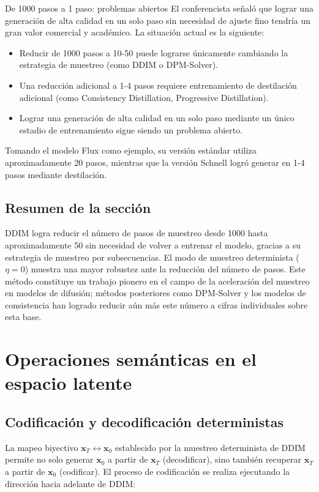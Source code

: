 \documentclass[a4paper]{article}
\begin{document}
\begin{knowledgebox}{De 1000 pasos a 1 paso: problemas abiertos}
El conferencista señaló que lograr una generación de alta calidad en un solo paso sin necesidad de ajuste fino tendría un gran valor comercial y académico. La situación actual es la siguiente:
\begin{itemize}
    \item Reducir de 1000 pasos a 10-50 puede lograrse únicamente cambiando la estrategia de muestreo (como DDIM o DPM-Solver).
    \item Una reducción adicional a 1-4 pasos requiere entrenamiento de destilación adicional (como Consistency Distillation, Progressive Distillation).
    \item Lograr una generación de alta calidad en un solo paso mediante un único estadio de entrenamiento sigue siendo un problema abierto.
\end{itemize}
Tomando el modelo Flux como ejemplo, su versión estándar utiliza aproximadamente 20 pasos, mientras que la versión Schnell logró generar en 1-4 pasos mediante destilación.
\end{knowledgebox}

\subsection{Resumen de la sección}

DDIM logra reducir el número de pasos de muestreo desde 1000 hasta aproximadamente 50 sin necesidad de volver a entrenar el modelo, gracias a su estrategia de muestreo por subsecuencias. El modo de muestreo determinista ($\eta=0$) muestra una mayor robustez ante la reducción del número de pasos. Este método constituye un trabajo pionero en el campo de la aceleración del muestreo en modelos de difusión; métodos posteriores como DPM-Solver y los modelos de consistencia han logrado reducir aún más este número a cifras individuales sobre esta base.
\section{Operaciones semánticas en el espacio latente}

\subsection{Codificación y decodificación deterministas}

La mapeo biyectivo $\mathbf{x}_T \leftrightarrow \mathbf{x}_0$ establecido por la muestreo determinista de DDIM permite no solo generar $\mathbf{x}_0$ a partir de $\mathbf{x}_T$ (decodificar), sino también recuperar $\mathbf{x}_T$ a partir de $\mathbf{x}_0$ (codificar). El proceso de codificación se realiza ejecutando la dirección hacia adelante de DDIM:
\end{document}

